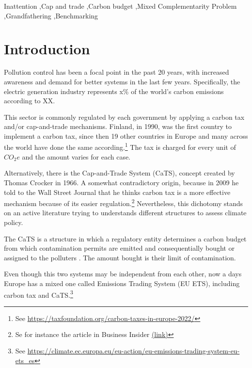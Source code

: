\documentclass[a4paper,fleqn]{cas-dc}
\begin{document}
\begin{keywords}
 Inattention \sep Cap and trade \sep Carbon budget \sep Mixed Complementarity Problem \sep Grandfathering \sep Benchmarking
\end{keywords}

\maketitle

\section{Introduction}\label{sec:intro}






Pollution control has been a focal point in the past 20 years, with increased awareness and demand for better systems in the last few years. Specifically, the electric generation industry represents x\% of the world's carbon emissions according to XX. 

This sector is commonly regulated by each government by applying a carbon tax and/or cap-and-trade mechanisms. Finland, in 1990, was the first country to implement a carbon tax, since then 19 other countries in Europe and many across the world have done the same according.\footnote{See \url{https://taxfoundation.org/carbon-taxes-in-europe-2022/}} The tax is charged for every unit of $CO_2 e$ and the amount varies for each case. 

Alternatively, there is the Cap-and-Trade System (CaTS), concept created by Thomas Crocker in 1966. A somewhat contradictory origin, because in 2009 he  told to the Wall Street Journal that he thinks carbon tax is a more effective mechanism because of its easier regulation.\footnote{Se for instance the article in Business Insider \href{https://www.businessinsider.com/inventor-of-cap-and-trade-says-a-carbon-tax-is-better-2009-8}{(link)}} Nevertheless, this dichotomy stands on an active literature trying to understands different structures to assess climate policy.


The CaTS is a structure in which a regulatory entity determines a carbon budget from which contamination permits are emitted and consequentially bought or assigned to the polluters \citep{hanemann_cap-and-trade_2010}. The amount bought is their limit of contamination.  

Even though this two systems may be independent from each other, now a days Europe has a mixed one called Emissions Trading System (EU ETS), including carbon tax and CaTS.\footnote{See \url{https://climate.ec.europa.eu/eu-action/eu-emissions-trading-system-eu-ets_es}} 
\end{document}
